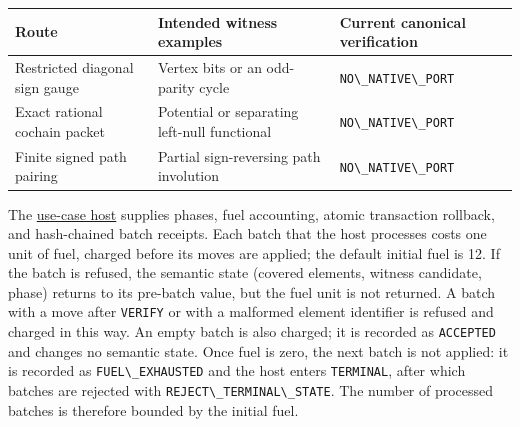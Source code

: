 \documentclass[
  11pt,
]{article}
\newcommand{\passthrough}[1]{#1}
\begin{document}
\begin{longtable}[]{@{}
  >{\raggedright\arraybackslash}p{}
  >{\raggedright\arraybackslash}p{}
  >{\raggedright\arraybackslash}p{}@{}}
\toprule\noalign{}
\begin{minipage}[b]{\linewidth}\raggedright
Route
\end{minipage} & \begin{minipage}[b]{\linewidth}\raggedright
Intended witness examples
\end{minipage} & \begin{minipage}[b]{\linewidth}\raggedright
Current canonical verification
\end{minipage} \\
\midrule\noalign{}
\endhead
\bottomrule\noalign{}
\endlastfoot
Restricted diagonal sign gauge & Vertex bits or an odd-parity cycle &
\passthrough{\lstinline!NO\_NATIVE\_PORT!} \\
Exact rational cochain packet & Potential or separating left-null
functional & \passthrough{\lstinline!NO\_NATIVE\_PORT!} \\
Finite signed path pairing & Partial sign-reversing path involution &
\passthrough{\lstinline!NO\_NATIVE\_PORT!} \\
\end{longtable}

The
\href{https://github.com/dbccpage/the_symbol_game/blob/52cb5457f6c485ba548cfd292f6012a941ed22cf/symbol_game/use_cases/mssn_sn_demos/demo_3/host.py}{use-case
host} supplies phases, fuel accounting, atomic transaction rollback, and
hash-chained batch receipts. Each batch that the host processes costs
one unit of fuel, charged before its moves are applied; the default
initial fuel is 12. If the batch is refused, the semantic state (covered
elements, witness candidate, phase) returns to its pre-batch value, but
the fuel unit is not returned. A batch with a move after
\passthrough{\lstinline!VERIFY!} or with a malformed element identifier
is refused and charged in this way. An empty batch is also charged; it
is recorded as \passthrough{\lstinline!ACCEPTED!} and changes no
semantic state. Once fuel is zero, the next batch is not applied: it is
recorded as \passthrough{\lstinline!FUEL\_EXHAUSTED!} and the host
enters \passthrough{\lstinline!TERMINAL!}, after which batches are
rejected with \passthrough{\lstinline!REJECT\_TERMINAL\_STATE!}. The
number of processed batches is therefore bounded by the initial fuel.
\end{document}
